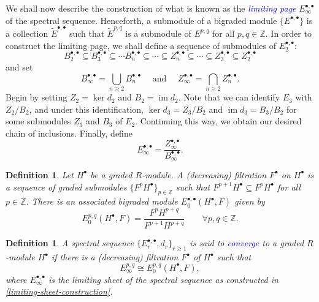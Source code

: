 \documentclass[11pt]{article}
\theoremstyle{thmstyle}
\theoremstyle{defstyle}
\newtheorem{definition}[theorem]{Definition}
\newcommand{\Z}{\mathbb{Z}}
\newcommand{\im}{\operatorname{im}}
\newcommand{\wt}[1]{\widetilde{#1}}
\newcommand{\define}[1]{\textcolor{blue}{\textit{#1}}}
\renewcommand{\ge}{\geqslant}
\begin{document}
We shall now describe the construction of what is known as the \define{limiting page} $E^{\bullet,\bullet}_{\infty}$ of the spectral sequence. Henceforth, a submodule of a bigraded module $\{E^{\bullet,\bullet}\}$ is a collection $\wt E^{\bullet,\bullet}$ such that $\wt E^{p, q}$ is a submodule of $E^{p, q}$ for all $p,q\in\Z$. In order to construct the limiting page, we shall define a sequence of submodules of $E_2^{\bullet,\bullet}$:
\begin{equation*}
    B_2^{\bullet,\bullet}\subseteq B_3^{\bullet,\bullet}\subseteq\cdots B_n^{\bullet,\bullet}\subseteq\cdots\subseteq Z_n^{\bullet,\bullet}\subseteq\cdots\subseteq Z_3^{\bullet,\bullet}\subseteq Z_2^{\bullet,\bullet}
\end{equation*}
and set 
\begin{equation*}
    B_\infty^{\bullet,\bullet} = \bigcup_{n\ge 2} B_n^{\bullet,\bullet}\quad\text{ and }\quad Z_\infty^{\bullet,\bullet} = \bigcap_{n\ge 2} Z_n^{\bullet,\bullet}.
\end{equation*}
Begin by setting $Z_2 = \ker d_2$ and $B_2 = \im d_2$. Note that we can identify $E_3$ with $Z_2/B_2$, and under this identification, $\ker d_3 = Z_3/B_2$ and $\im d_3 = B_3/B_2$ for some submodules $Z_3$ and $B_3$ of $E_2$. Continuing this way, we obtain our desired chain of inclusions. Finally, define 
\begin{equation}
    E^{\bullet,\bullet}_\infty = \frac{Z^{\bullet,\bullet}_\infty}{B^{\bullet,\bullet}_\infty}.\label{limiting-sheet-construction} \tag{$\dagger$}
\end{equation}

\begin{definition}
    Let $H^\bullet$ be a graded $R$-module. A (decreasing) filtration $F^\bullet$ on $H^\bullet$ is a sequence of graded submodules $\{F^p H^\bullet\}_{p\in\Z}$ such that $F^{p + 1}H^\bullet\subseteq F^p H^\bullet$ for all $p\in\Z$. There is an associated bigraded module $E_0^{\bullet,\bullet}(H^\bullet, F)$ given by 
    \begin{equation*}
        E^{p, q}_0(H^\bullet, F) = \frac{F^p H^{p + q}}{F^{p + 1}H^{p + q}}\qquad\forall p,q\in\Z.
    \end{equation*}
\end{definition}

\begin{definition}
    A spectral sequence $\{E^{\bullet,\bullet}_r, d_r\}_{r\ge 1}$ is said to \define{converge} to a graded $R$-module $H^\bullet$ if there is a (decreasing) filtration $F^\bullet$ of $H^\bullet$ such that 
    \begin{equation*}
        E^{p, q}_\infty \cong E^{p, q}_0(H^\bullet, F),
    \end{equation*}
    where $E^{\bullet, \bullet}_\infty$ is the limiting sheet of the spectral sequence as constructed in \eqref{limiting-sheet-construction}.
\end{definition}
\end{document}
